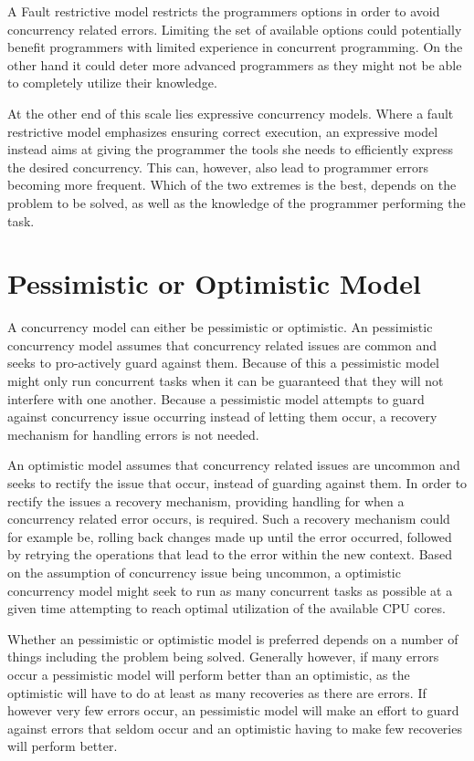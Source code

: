 A Fault restrictive model restricts the programmers options in order to avoid concurrency related errors. Limiting the set of available options could potentially benefit programmers with limited experience in concurrent programming. On the other hand it could deter more advanced programmers as they might not be able to completely utilize their knowledge.

At the other end of this scale lies expressive concurrency models. Where a fault restrictive model emphasizes ensuring correct execution, an expressive model instead aims at giving the programmer the tools she needs to efficiently express the desired concurrency. This can, however, also lead to programmer errors becoming more frequent. Which of the two extremes is the best, depends on the problem to be solved, as well as the knowledge of the programmer performing the task.
 
\section{Pessimistic or Optimistic Model}
A concurrency model can either be pessimistic or optimistic. An pessimistic concurrency model assumes that concurrency related issues are common and seeks to pro-actively guard against them\cite[p. 170]{weikum2001transactional}. Because of this a pessimistic model might only run concurrent tasks when it can be guaranteed that they will not interfere with one another. Because a pessimistic model attempts to guard against concurrency issue occurring instead of letting them occur, a recovery mechanism for handling errors is not needed.

An optimistic model assumes that concurrency related issues are uncommon and seeks to rectify the issue that occur, instead of guarding against them\cite[p. 170]{weikum2001transactional}. In order to rectify the issues a recovery mechanism, providing handling for when a concurrency related error occurs, is required. Such a recovery mechanism could for example be, rolling back changes made up until the error occurred, followed by retrying the operations that lead to the error within the new context. Based on the assumption of concurrency issue being uncommon, a optimistic concurrency model might seek to run as many concurrent tasks as possible at a given time attempting to reach optimal utilization of the available \ac{CPU} cores.

Whether an pessimistic or optimistic model is preferred depends on a number of things including the problem being solved. Generally however, if many errors occur a pessimistic model will perform better than an optimistic, as the optimistic will have to do at least as many recoveries as there are errors. If however very few errors occur, an pessimistic model will make an effort to guard against errors that seldom occur and an optimistic having to make few recoveries will perform better.

